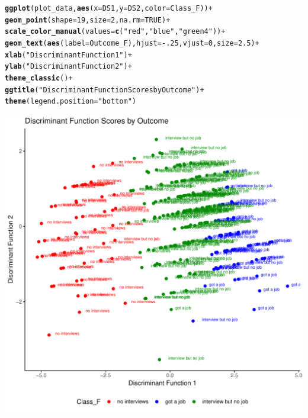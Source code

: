 \documentclass{article}\usepackage[]{graphicx}\usepackage[]{color}
\makeatletter
\def\maxwidth{ %
  \ifdim\Gin@nat@width>\linewidth
    \linewidth
  \else
    \Gin@nat@width
  \fi
}
\newcommand{\hlnum}[1]{\textcolor[rgb]{0.686,0.059,0.569}{#1}}%
\newcommand{\hlstr}[1]{\textcolor[rgb]{0.192,0.494,0.8}{#1}}%
\newcommand{\hlopt}[1]{\textcolor[rgb]{0,0,0}{#1}}%
\newcommand{\hlstd}[1]{\textcolor[rgb]{0.345,0.345,0.345}{#1}}%
\newcommand{\hlkwc}[1]{\textcolor[rgb]{0.333,0.667,0.333}{#1}}%
\newcommand{\hlkwd}[1]{\textcolor[rgb]{0.737,0.353,0.396}{\textbf{#1}}}%
\newenvironment{kframe}{%
 \def\at@end@of@kframe{}%
 \ifinner\ifhmode%
  \def\at@end@of@kframe{\end{minipage}}%
  \begin{minipage}{\columnwidth}%
 \fi\fi%
 \def\FrameCommand##1{\hskip\@totalleftmargin \hskip-\fboxsep
 \colorbox{shadecolor}{##1}\hskip-\fboxsep
     \hskip-\linewidth \hskip-\@totalleftmargin \hskip\columnwidth}%
 \MakeFramed {\advance\hsize-\width
   \@totalleftmargin\z@ \linewidth\hsize
   \@setminipage}}%
 {\par\unskip\endMakeFramed%
 \at@end@of@kframe}
\newenvironment{knitrout}{}{} %
\makeatother
\begin{document}
\begin{knitrout}
\begin{kframe}
\begin{alltt}
\hlkwd{ggplot}\hlstd{(plot_data,} \hlkwd{aes}\hlstd{(}\hlkwc{x} \hlstd{= DS1,} \hlkwc{y} \hlstd{= DS2,} \hlkwc{color} \hlstd{= Class_F))} \hlopt{+}
  \hlkwd{geom_point}\hlstd{(}\hlkwc{shape} \hlstd{=} \hlnum{19}\hlstd{,} \hlkwc{size} \hlstd{=} \hlnum{2}\hlstd{,} \hlkwc{na.rm} \hlstd{=} \hlnum{TRUE}\hlstd{)} \hlopt{+}
  \hlkwd{scale_color_manual}\hlstd{(}\hlkwc{values} \hlstd{=}\hlkwd{c}\hlstd{(}\hlstr{"red"}\hlstd{,} \hlstr{"blue"}\hlstd{,} \hlstr{"green4"}\hlstd{))} \hlopt{+}
  \hlkwd{geom_text}\hlstd{(}\hlkwd{aes}\hlstd{(}\hlkwc{label} \hlstd{= Outcome_F),} \hlkwc{hjust} \hlstd{=} \hlopt{-}\hlnum{.25}\hlstd{,} \hlkwc{vjust} \hlstd{=} \hlnum{0}\hlstd{,} \hlkwc{size} \hlstd{=} \hlnum{2.5}\hlstd{)} \hlopt{+}
  \hlkwd{xlab}\hlstd{(}\hlstr{"Discriminant Function 1"}\hlstd{)} \hlopt{+}
  \hlkwd{ylab}\hlstd{(}\hlstr{"Discriminant Function 2"}\hlstd{)} \hlopt{+}
  \hlkwd{theme_classic}\hlstd{()} \hlopt{+}
  \hlkwd{ggtitle}\hlstd{(}\hlstr{"Discriminant Function Scores by Outcome"}\hlstd{)} \hlopt{+}
  \hlkwd{theme}\hlstd{(}\hlkwc{legend.position} \hlstd{=} \hlstr{"bottom"}\hlstd{)}
\end{alltt}
\end{kframe}
\includegraphics[width=\maxwidth]{figure/unnamed-chunk-8-1} 

\end{knitrout}
\end{document}
